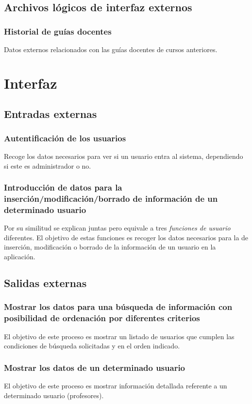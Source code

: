 \documentclass[11pt,a4paper,spanish,twoside]{book}
\begin{document}
\subsection{Archivos lógicos de interfaz externos}
\subsubsection{Historial de guías docentes}
Datos externos relacionados con las guías docentes de cursos anteriores. 
 
\section{Interfaz}
\subsection{Entradas externas}
\subsubsection{Autentificación de los usuarios}
Recoge los datos necesarios para ver si un usuario entra al sistema,
dependiendo si este es administrador o no.

\subsubsection{Introducción de datos para la inserción/modificación/borrado 
de información de un determinado usuario}
Por su similitud se explican juntas pero equivale a tres \emph{funciones de
usuario} diferentes. El objetivo de estas funciones es recoger los datos
necesarios para la de inserción, modificación o borrado de la información de
un usuario en la aplicación.

\subsection{Salidas externas}
\subsubsection{Mostrar los datos para una búsqueda de información con
  posibilidad de ordenación por diferentes criterios}
El objetivo de este proceso es mostrar un listado de usuarios que cumplen las
condiciones de búsqueda solicitadas y en el orden indicado.

\subsubsection{Mostrar los datos de un determinado usuario}
El objetivo de este proceso es mostrar información detallada referente a un
determinado usuario (profesores).
\end{document}
